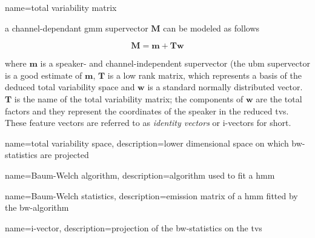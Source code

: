 


{
    name=total variability matrix
}
{
a channel-dependant \gls{gmm} supervector $\bm{M}$ can be modeled as follows

\begin{equation}
\bm{M} = \bm{m} + \bm{T} \bm{w}
\end{equation}

where $\bm{m}$ is a speaker- and channel-independent supervector (the \gls{ubm}
supervector is a good estimate of $\bm{m}$, $\bm{T}$ is a low rank matrix, which
represents a basis of the deduced total variability space and $\bm{w}$ is a
standard normally distributed vector. $\bm{T}$ is the name of the total
variability matrix; the components of $\bm{w}$ are the total factors and they
represent the coordinates of the speaker in the reduced \gls{tvs}. These feature
vectors are referred to as \emph{identity vectors} or \glspl{i-vector} for
short.
}

{
    name=total variability space,
    description={lower dimensional space on which \gls{bw-statistics}
        are projected}
}

{
    name=Baum-Welch algorithm,
    description={algorithm used to fit a \gls{hmm}}
}

{
    name=Baum-Welch statistics,
    description={emission matrix of a \gls{hmm} fitted by the
        \gls{bw-algorithm}}
}

{
    name=i-vector,
    description={projection of the \gls{bw-statistics} on the \gls{tvs}}
}

